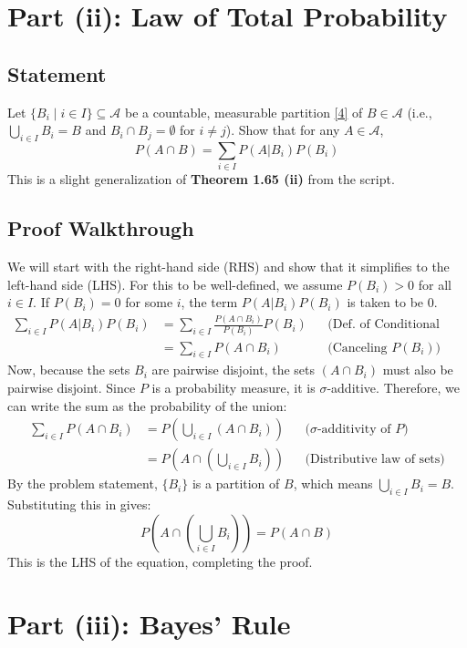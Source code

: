 \documentclass[11pt,a4paper]{article}
\begin{document}
\section{Part (ii): Law of Total Probability}

\subsection*{Statement}
Let \(\{B_i \mid i \in I\} \subseteq \mathcal{A}\) be a countable, measurable partition \hyperlink{note4}{[4]} of \(B \in \mathcal{A}\) (i.e., \(\bigcup_{i \in I} B_i = B\) and \(B_i \cap B_j = \emptyset\) for \(i \neq j\)). Show that for any \(A \in \mathcal{A}\),
\[ P(A \cap B) = \sum_{i \in I} P(A | B_i)P(B_i) \]
This is a slight generalization of \textbf{Theorem 1.65 (ii)} from the script.

\subsection*{Proof Walkthrough}
We will start with the right-hand side (RHS) and show that it simplifies to the left-hand side (LHS). For this to be well-defined, we assume \(P(B_i) > 0\) for all \(i \in I\). If \(P(B_i) = 0\) for some \(i\), the term \(P(A|B_i)P(B_i)\) is taken to be 0.
\begin{align*}
    \sum_{i \in I} P(A | B_i)P(B_i) &= \sum_{i \in I} \frac{P(A \cap B_i)}{P(B_i)} P(B_i) && \text{(Def. of Conditional Probability)} \\
    &= \sum_{i \in I} P(A \cap B_i) && \text{(Canceling \(P(B_i)\))}
\end{align*}
Now, because the sets \(B_i\) are pairwise disjoint, the sets \((A \cap B_i)\) must also be pairwise disjoint. Since \(P\) is a probability measure, it is \(\sigma\)-additive. Therefore, we can write the sum as the probability of the union:
\begin{align*}
    \sum_{i \in I} P(A \cap B_i) &= P\left(\bigcup_{i \in I} (A \cap B_i)\right) && \text{(\(\sigma\)-additivity of \(P\))} \\
    &= P\left(A \cap \left(\bigcup_{i \in I} B_i\right)\right) && \text{(Distributive law of sets)}
\end{align*}
By the problem statement, \(\{B_i\}\) is a partition of \(B\), which means \(\bigcup_{i \in I} B_i = B\). Substituting this in gives:
\[ P\left(A \cap \left(\bigcup_{i \in I} B_i\right)\right) = P(A \cap B) \]
This is the LHS of the equation, completing the proof.

\section{Part (iii): Bayes' Rule}
\end{document}
